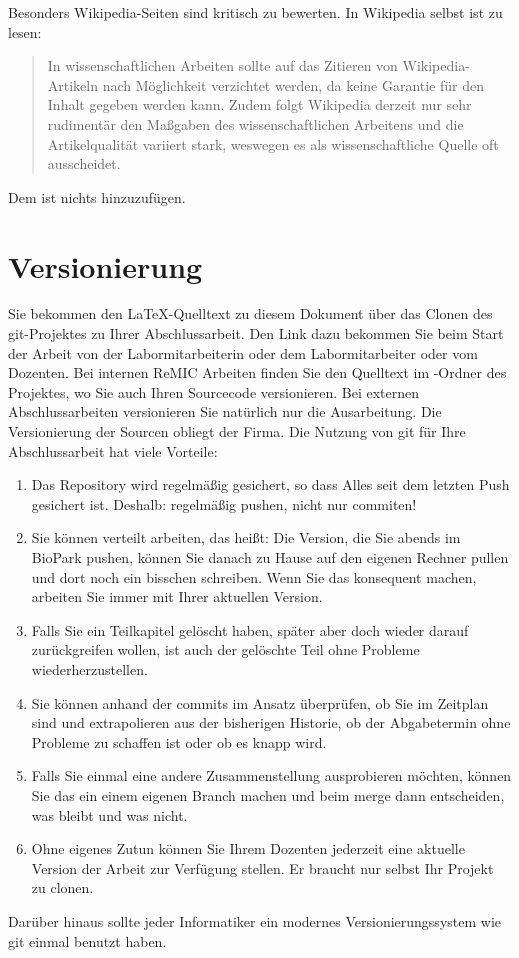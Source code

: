 Besonders Wikipedia-Seiten sind kritisch zu bewerten. In Wikipedia selbst ist zu lesen:
\begin{quote}
\glqq In wissenschaftlichen Arbeiten sollte auf das Zitieren von Wikipedia-Artikeln nach Möglichkeit verzichtet werden, da keine Garantie für den Inhalt gegeben werden kann.
Zudem folgt Wikipedia derzeit nur sehr rudimentär den Maßgaben des wissenschaftlichen Arbeitens und die Artikelqualität variiert stark, weswegen es als wissenschaftliche Quelle oft ausscheidet.\grqq \cite{zitieren13a}
\end{quote}
Dem ist nichts hinzuzufügen.

\section{Versionierung}
\label{versionierung}

Sie bekommen den \LaTeX -Quelltext zu diesem Dokument über das Clonen des git-Projektes zu Ihrer Abschlussarbeit.
Den Link dazu bekommen Sie beim Start der Arbeit von der Labormitarbeiterin oder dem Labormitarbeiter oder vom Dozenten.
Bei internen ReMIC Arbeiten finden Sie den Quelltext im -Ordner des Projektes, wo Sie auch Ihren Sourcecode versionieren.
Bei externen Abschlussarbeiten versionieren Sie natürlich nur die Ausarbeitung.
Die Versionierung der Sourcen obliegt der Firma.
Die Nutzung von git für Ihre Abschlussarbeit hat viele Vorteile:
\begin{enumerate}
\item Das Repository wird regelmäßig gesichert, so dass Alles seit dem letzten Push gesichert ist.
Deshalb: regelmäßig pushen, nicht nur commiten!
\item Sie können verteilt arbeiten, das heißt:
Die Version, die Sie abends im BioPark pushen, können Sie danach zu Hause auf den eigenen Rechner pullen und dort noch ein bisschen schreiben.
Wenn Sie das konsequent machen, arbeiten Sie immer mit Ihrer aktuellen Version.
\item Falls Sie ein Teilkapitel gelöscht haben, später aber doch wieder darauf zurückgreifen wollen, ist auch der gelöschte Teil ohne Probleme wiederherzustellen.
\item Sie können anhand der commits im Ansatz überprüfen, ob Sie im Zeitplan sind und extrapolieren aus der bisherigen Historie, ob der Abgabetermin ohne Probleme zu schaffen ist oder ob es knapp wird.
\item Falls Sie einmal eine andere Zusammenstellung ausprobieren möchten, können Sie das ein einem eigenen Branch machen und beim merge dann entscheiden, was bleibt und was nicht.
\item Ohne eigenes Zutun können Sie Ihrem Dozenten jederzeit eine aktuelle Version der Arbeit zur Verfügung stellen.
Er braucht nur selbst Ihr Projekt zu clonen.
\end{enumerate}
Darüber hinaus sollte jeder Informatiker ein modernes Versionierungssystem wie git einmal benutzt haben.

